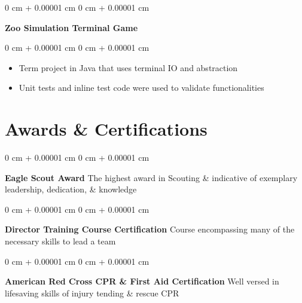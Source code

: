 \documentclass[10pt, letterpaper]{article}
\newenvironment{highlights}{
    \begin{itemize}[
        topsep=0.10 cm,
        parsep=0.10 cm,
        partopsep=0pt,
        itemsep=0pt,
        leftmargin=0 cm + 10pt
    ]
}{
    \end{itemize}
} %
\newenvironment{onecolentry}{
    \begin{adjustwidth}{
        0 cm + 0.00001 cm
    }{
        0 cm + 0.00001 cm
    }
}{
    \end{adjustwidth}
} %
\newenvironment{twocolentry}[2][]{
    \onecolentry%
    \def\secondColumn{#2}
    \setcolumnwidth{\fill, 6.0 cm}
    \begin{paracol}{2}
}{
    \switchcolumn\raggedleft\secondColumn%
    \end{paracol}
    \endonecolentry%
} %
\begin{document}
        
        \vspace{0.2 cm}

        \begin{twocolentry}{
            \href{https://github.com/thatchereames/animal-game}{\color{secondaryColor}{github.com/thatchereames/animal-game}}
        }
            \textbf{Zoo Simulation Terminal Game}\end{twocolentry}

        \vspace{0.10 cm}
        \begin{onecolentry}
            \begin{highlights}
                \item Term project in Java that uses terminal IO and abstraction
                \item Unit tests and inline test code were used to validate functionalities 
            \end{highlights}
        \end{onecolentry}




    
    {\color{secondaryColor}\section{Awards \& Certifications}}

        \begin{onecolentry}
            \textbf{Eagle Scout Award} The highest award in Scouting \& indicative of exemplary leadership, dedication, \& knowledge
        \end{onecolentry}

        \vspace{0.1 cm}

        \begin{onecolentry}
            \textbf{Director Training Course Certification} Course encompassing many of the necessary skills to lead a team
        \end{onecolentry}

        \vspace{0.1 cm}

        \begin{onecolentry}
            \textbf{American Red Cross CPR \& First Aid Certification} Well versed in lifesaving skills of injury tending \& rescue CPR
        \end{onecolentry}
    
\end{document}
